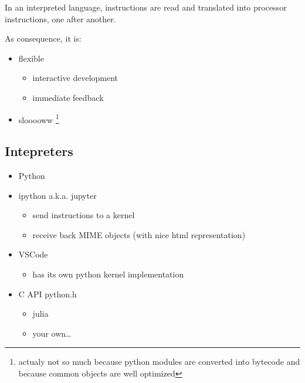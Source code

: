 \documentclass[
  letterpaper,
  DIV=11,
  numbers=noendperiod]{scrartcl}
\providecommand{\tightlist}{%
  \setlength{\itemsep}{0pt}\setlength{\parskip}{0pt}}\usepackage{longtable,booktabs,array}
\begin{document}
\begin{tcolorbox}[enhanced jigsaw, opacityback=0, breakable, bottomrule=.15mm, bottomtitle=1mm, opacitybacktitle=0.6, left=2mm, coltitle=black, titlerule=0mm, leftrule=.75mm, toprule=.15mm, colback=white, toptitle=1mm, title=\textcolor{quarto-callout-note-color}{\faInfo}\hspace{0.5em}{Interpreted language}, arc=.35mm, rightrule=.15mm, colframe=quarto-callout-note-color-frame, colbacktitle=quarto-callout-note-color!10!white]

In an interpreted language, instructions are read and translated into
processor instructions, one after another.

\end{tcolorbox}

As consequence, it is:

\begin{itemize}
\tightlist
\item
  flexible

  \begin{itemize}
  \tightlist
  \item
    interactive development
  \item
    immediate feedback
  \end{itemize}
\item
  slooooww \footnote{actualy not so much because python modules are
    converted into bytecode and because common objects are well
    optimized}
\end{itemize}

\subsection{Intepreters}\label{intepreters}

\begin{itemize}
\tightlist
\item
  Python
\item
  ipython a.k.a. jupyter

  \begin{itemize}
  \tightlist
  \item
    send instructions to a kernel
  \item
    receive back MIME objects (with nice html representation)
  \end{itemize}
\item
  VSCode

  \begin{itemize}
  \tightlist
  \item
    has its own python kernel implementation
  \end{itemize}
\item
  C API python.h

  \begin{itemize}
  \tightlist
  \item
    julia
  \item
    your own\ldots{}
  \end{itemize}
\end{itemize}
\end{document}
